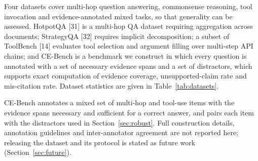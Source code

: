 \documentclass[journal,10pt,a4paper]{IEEEtran}
\begin{document}
Four datasets cover multi-hop question answering, commonsense reasoning, tool invocation and evidence-annotated mixed tasks, so that generality can be assessed. HotpotQA [31] is a multi-hop QA dataset requiring aggregation across documents; StrategyQA [32] requires implicit decomposition; a subset of ToolBench [14] evaluates tool selection and argument filling over multi-step API chains; and CE-Bench is a benchmark we construct in which every question is annotated with a set of necessary evidence spans and a set of distractors, which supports exact computation of evidence coverage, unsupported-claim rate and mis-citation rate. Dataset statistics are given in Table~\ref{tab:datasets}.

CE-Bench annotates a mixed set of multi-hop and tool-use items with the evidence spans necessary and sufficient for a correct answer, and pairs each item with the distractors used in Section~\ref{sec:robust}. Full construction details, annotation guidelines and inter-annotator agreement are not reported here; releasing the dataset and its protocol is stated as future work (Section~\ref{sec:future}).

\begin{table}[t]
\caption{Dataset Statistics}
\label{tab:datasets}
\centering
\footnotesize
{}
\end{table}
\end{document}
